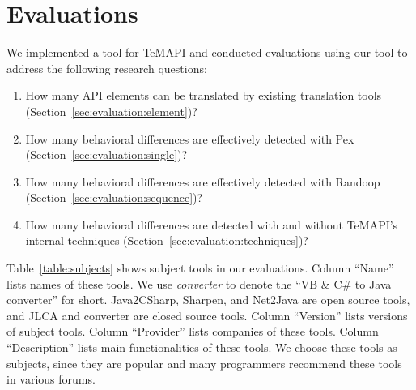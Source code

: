 
\section{Evaluations}
\label{sec:evaluation}

We implemented a tool for TeMAPI and conducted evaluations using our tool to address the following research questions:

\begin{enumerate}
\item How many API elements can be translated by existing translation tools (Section~\ref{sec:evaluation:element})? %
\item How many behavioral differences are effectively detected with Pex (Section~\ref{sec:evaluation:single})?%
\item How many behavioral differences are effectively detected with Randoop (Section~\ref{sec:evaluation:sequence})?%
\item How many behavioral differences are detected with and without TeMAPI's internal techniques (Section~\ref{sec:evaluation:techniques})?
\end{enumerate}%

Table~\ref{table:subjects} shows subject tools in our evaluations. Column ``Name'' lists names of these tools. We use \emph{converter} to denote the ``VB \& C\# to Java converter'' for short. Java2CSharp, Sharpen, and Net2Java are open source tools, and JLCA and converter are closed source tools. Column ``Version'' lists versions of subject tools. Column ``Provider'' lists companies of these tools. Column ``Description'' lists main functionalities of these tools. We choose these tools as subjects, since they are popular and many programmers recommend these tools in various forums.

